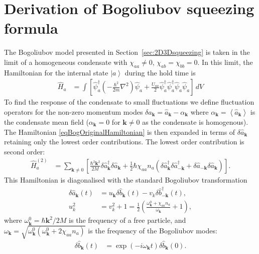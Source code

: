 \documentclass{iopart}
\newcommand{\expect}[1]{\ensuremath{\left<#1\right>}}
\newcommand{\ket}[1]{\ensuremath{\left|#1\right>}}
\begin{document}
\section{Derivation of Bogoliubov squeezing formula}
\label{appendixBogDerivation}

The Bogoliubov model presented in Section~\ref{sec:2D3Dsqueezing} is taken in the limit of a homogeneous condensate with $\chi_{aa}\neq 0$, $\chi_{ab}=\chi_{bb}=0$.  In this limit, the Hamiltonian for the internal state $\ket{a}$ during the hold time is
\begin{align}
  \hat{H}_{a} &= \int \left[ \hat{\psi}_a^\dagger \left(-\frac{\hbar^2}{2 m}\nabla^2\right) \hat{\psi}_a + \frac{U_{aa}}{2} \hat{\psi}_a^\dagger \hat{\psi}_a^\dagger \hat{\psi}_a \hat{\psi}_a \right] \,dV \label{eqBogOriginalHamiltonian}
\end{align}
To find the response of the condensate to small fluctuations we define fluctuation operators for the non-zero momentum modes $\delta\hat{a}_\mathbf{k} = \hat{a}_\mathbf{k} - \alpha_\mathbf{k}$ where $\alpha_\mathbf{k} = \expect{\hat{a}_\mathbf{k}}$ is the condensate mean field ($\alpha_\mathbf{k}=0$ for $\mathbf{k} \neq 0$ as the condensate is homogenous).  The Hamiltonian \eqref{eqBogOriginalHamiltonian} is then expanded in terms of $\delta\hat{a}_\mathbf{k}$ retaining only the lowest order contributions.  The lowest order contribution is second order:
\begin{align}
  \hat{H}_{a}^{(2)} &= \sum_{\mathbf{k}\neq 0} \left[ \frac{\hbar^2 \mathbf{k}^2}{2M} \delta\hat{a}_\mathbf{k}^\dagger \delta\hat{a}_\mathbf{k} + \frac{1}{2} \hbar \chi_{aa} n_a \left(\delta\hat{a}_\mathbf{k}^\dagger \delta\hat{a}_{-\mathbf{k}}^\dagger + \delta\hat{a}_{-\mathbf{k}} \delta\hat{a}_{\mathbf{k}} \right) \right].
\end{align}
This Hamiltonian is diagonalised with the standard Bogoliubov transformation \cite{PethickSmith}
\begin{align}
  \delta \hat{a}_\mathbf{k}(t) &= u_\mathbf{k} \delta\hat{b}_\mathbf{k}(t) - v_k \delta\hat{b}_{-\mathbf{k}}^\dagger(t),\\
  u_k^2 &= v_k^2+1 = \frac{1}{2} \left(\frac{\omega^0_\mathbf{k} + \chi_{aa}n_a}{\omega_\mathbf{k}} +1\right),
\end{align}
where $\omega^0_\mathbf{k} = \hbar \mathbf{k}^2/2M$ is the frequency of a free particle, and $\omega_\mathbf{k} = \sqrt{\omega^0_\mathbf{k}(\omega^0_\mathbf{k} + 2 \chi_{aa} n_a)}$ is the frequency of the Bogoliubov modes:
\begin{align}
  \delta\hat{b}_\mathbf{k}(t) &= \exp\left(-i \omega_\mathbf{k} t\right)\delta\hat{b}_\mathbf{k}(0).
\end{align}
\end{document}

